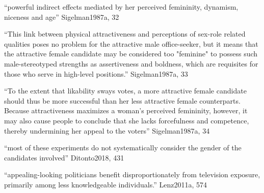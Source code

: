 
``powerful indirect effects mediated by her perceived femininity, dynamism, niceness and age'' Sigelman1987a, 32

``This link between physical attractiveness and perceptions of sex-role related qualities poses no problem for the attractive male office-seeker, but it means that the attractive female candidate may be considered too "feminine" to possess such male-stereotyped strengths as assertiveness and boldness, which are requisites for those who serve in high-level positions.''  Sigelman1987a, 33

``To the extent that likability sways votes, a more attractive female candidate should thus be more successful than her less attractive female counterparts. Because attractiveness maximizes a woman's perceived femininity, however, it may also cause people to conclude that she lacks forcefulness and competence, thereby undermining her appeal to the voters''  Sigelman1987a, 34

``most of these experiments do not systematically consider the gender of the candidates involved'' Ditonto2018, 431










``appealing-looking politicians benefit disproportionately from television exposure, primarily among less knowledgeable individuals.'' Lenz2011a, 574

